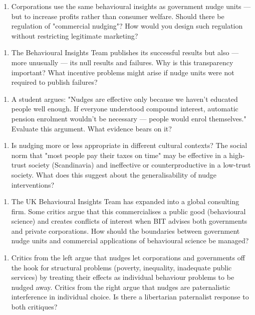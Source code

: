 \documentclass[12pt, letterpaper]{article}
\begin{document}
\begin{enumerate}
\item Corporations use the same behavioural insights as government nudge units --- but to increase profits rather than consumer welfare. Should there be regulation of "commercial nudging"? How would you design such regulation without restricting legitimate marketing?
\end{enumerate}

\begin{enumerate}
\item The Behavioural Insights Team publishes its successful results but also --- more unusually --- its null results and failures. Why is this transparency important? What incentive problems might arise if nudge units were not required to publish failures?
\end{enumerate}

\begin{enumerate}
\item A student argues: "Nudges are effective only because we haven't educated people well enough. If everyone understood compound interest, automatic pension enrolment wouldn't be necessary --- people would enrol themselves." Evaluate this argument. What evidence bears on it?
\end{enumerate}

\begin{enumerate}
\item Is nudging more or less appropriate in different cultural contexts? The social norm that "most people pay their taxes on time" may be effective in a high-trust society (Scandinavia) and ineffective or counterproductive in a low-trust society. What does this suggest about the generalisability of nudge interventions?
\end{enumerate}

\begin{enumerate}
\item The UK Behavioural Insights Team has expanded into a global consulting firm. Some critics argue that this commercialises a public good (behavioural science) and creates conflicts of interest when BIT advises both governments and private corporations. How should the boundaries between government nudge units and commercial applications of behavioural science be managed?
\end{enumerate}

\begin{enumerate}
\item Critics from the left argue that nudges let corporations and governments off the hook for structural problems (poverty, inequality, inadequate public services) by treating their effects as individual behaviour problems to be nudged away. Critics from the right argue that nudges are paternalistic interference in individual choice. Is there a libertarian paternalist response to both critiques?
\end{enumerate}
\end{document}

